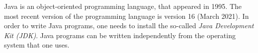 Java is an object-oriented programming language, that appeared in 1995. The most recent version of the programming language is version 16 (March 2021). In order to write Java programs, one needs to install the so-called \emph{Java Development Kit (JDK)}. Java programs can be written independently from the operating system that one uses.